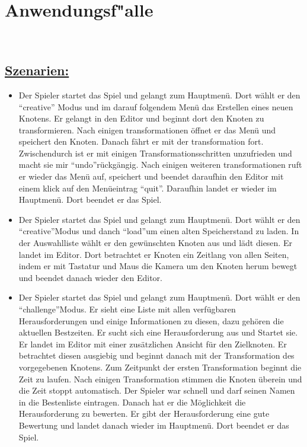 %
%


\section{Anwendungsf{"a}lle}
\label{NU:AF}~\\



\subsection*{\underline{Szenarien:}}

\begin{itemize}	
\item Der Spieler startet das Spiel und gelangt zum Hauptmenü. Dort wählt er den "`creative"' Modus und im darauf folgendem Menü das Erstellen eines neuen Knotens. Er gelangt in den Editor und beginnt dort den Knoten zu transformieren. Nach einigen transformationen öffnet er das Menü und speichert den Knoten. Danach fährt er mit der transformation fort. Zwischendurch ist er mit einigen Transformationsschritten unzufrieden und macht sie mir \textquotedblleft{}undo\textquotedblright rückgängig. Nach einigen weiteren transformationen ruft er wieder das Menü auf, speichert und beendet daraufhin den Editor mit einem klick auf den Menüeintrag \textquotedblleft{}quit\textquotedblright{}. Daraufhin landet er wieder im Hauptmenü. Dort beendet er das Spiel.

\item Der Spieler startet das Spiel und gelangt zum Hauptmenü. Dort wählt er den \textquotedblleft{}creative\textquotedblright Modus und danch \textquotedblleft{}load\textquotedblright um einen alten Speicherstand zu laden. In der Auswahlliste wählt er den gewünschten Knoten aus und lädt diesen. Er landet im Editor. Dort betrachtet er Knoten ein Zeitlang von allen Seiten, indem er mit Tastatur und Maus die Kamera um den Knoten herum bewegt und beendet danach wieder den Editor.

\item  Der Spieler startet das Spiel und gelangt zum Hauptmenü. Dort wählt er den \textquotedblleft{}challenge\textquotedblright Modus. Er sieht eine Liste mit allen verfügbaren Herausforderungen und einige Informationen zu diesen, dazu gehören die aktuellen Bestzeiten. Er sucht sich eine Herausforderung aus und Startet sie. Er landet im Editor mit einer zusätzlichen Ansicht für den Zielknoten. Er betrachtet diesen ausgiebig und beginnt danach mit der Transformation des vorgegebenen Knotens. Zum Zeitpunkt der ersten Transformation beginnt die Zeit zu laufen. Nach einigen Transformation stimmen die Knoten überein und die Zeit stoppt automatisch. Der Spieler war schnell und darf seinen Namen in die Bestenliste eintragen. Danach hat er die Möglichkeit die Herausforderung zu bewerten. Er gibt der Herausforderung eine gute Bewertung und landet danach wieder im Hauptmenü. Dort beendet er das Spiel.


\end{itemize}
